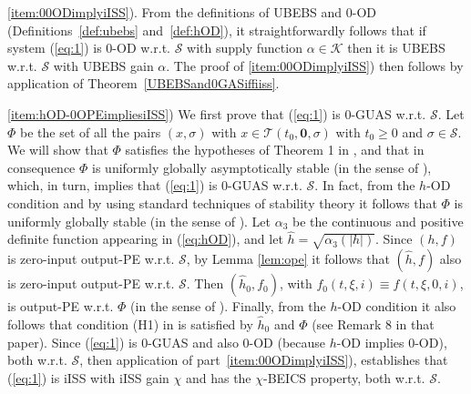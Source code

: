 \documentclass[9pt,final,journal]{IEEEtran}
\newtheorem{lema}{Lemma}
\def\K{\mathcal{K}}
\def\S{\mathcal{S}}
\def\T{\mathcal{T}}
\begin{document}
\begin{IEEEproof}
  \ref{item:00ODimplyiISS}). From the definitions of UBEBS and 0-OD (Definitions~\ref{def:ubebs} and~\ref{def:hOD}), it straightforwardly follows that if system (\ref{eq:1}) is 0-OD w.r.t. $\S$ with supply function $\alpha\in \K$ then it is UBEBS w.r.t. $\S$ with UBEBS gain $\alpha$. The proof of \ref{item:00ODimplyiISS}) then follows by application of Theorem~\ref{UBEBSand0GASiffiiss}. 

  \ref{item:hOD-0OPEimpliesiISS}) We first prove that (\ref{eq:1}) is 0-GUAS w.r.t. $\S$. Let $\Phi$ be the set of all the pairs $(x,\sigma)$ with $x\in \T(t_0,\mathbf{0},\sigma)$ with $t_0\ge 0$ and $\sigma\in \S$. We will show that $\Phi$ satisfies the hypotheses of Theorem 1 in \cite{leejia_tac08}, and that in consequence $\Phi$ is uniformly globally asymptotically stable (in the sense of \cite{leejia_tac08}), which, in turn, implies that (\ref{eq:1}) is  0-GUAS w.r.t. $\S$.
%
In fact, from the $h$-OD condition and by using standard techniques of stability theory it follows that $\Phi$ is uniformly globally stable (in the sense of \cite{leejia_tac08}). Let $\alpha_3$ be the continuous and positive definite function appearing in (\ref{eq:hOD}), and let $\hat{h}=\sqrt{\alpha_3(|h|)}$. Since $(h,f)$ is zero-input output-PE w.r.t. $\S$, by Lemma \ref{lem:ope} it follows that  $(\hat{h},f)$ also is zero-input output-PE w.r.t. $\S$. Then $(\hat{h}_0,f_0)$, with $f_0(t,\xi,i)\equiv f(t,\xi,0,i)$, is output-PE w.r.t. $\Phi$ (in the sense of \cite{leejia_tac08}). Finally, from the $h$-OD condition it also follows that condition (H1) in \cite{leejia_tac08} is satisfied by $\hat{h}_0$ and $\Phi$ (see Remark 8 in that paper).
%
Since (\ref{eq:1}) is 0-GUAS and also 0-OD (because $h$-OD implies 0-OD), both w.r.t. $\S$, then application of part~\ref{item:00ODimplyiISS}), establishes that (\ref{eq:1}) is iISS with iISS gain $\chi$ and has the $\chi$-BEICS property, both w.r.t. $\S$.
\end{IEEEproof}

\end{document}
